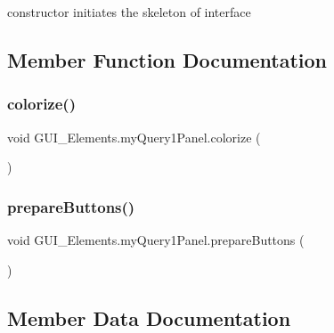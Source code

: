 constructor initiates the skeleton of interface 



\subsection{Member Function Documentation}
\hypertarget{class_g_u_i___elements_1_1my_query1_panel_ae73a3545beb076fc0f7114e6175bd423}{}\label{class_g_u_i___elements_1_1my_query1_panel_ae73a3545beb076fc0f7114e6175bd423} 
\subsubsection{\texorpdfstring{colorize()}{colorize()}}
{\footnotesize\ttfamily void G\+U\+I\+\_\+\+Elements.\+my\+Query1\+Panel.\+colorize (\begin{DoxyParamCaption}{ }\end{DoxyParamCaption})}

\hypertarget{class_g_u_i___elements_1_1my_query1_panel_a0b16368de01ed227e625524541a455ea}{}\label{class_g_u_i___elements_1_1my_query1_panel_a0b16368de01ed227e625524541a455ea} 
\subsubsection{\texorpdfstring{prepare\+Buttons()}{prepareButtons()}}
{\footnotesize\ttfamily void G\+U\+I\+\_\+\+Elements.\+my\+Query1\+Panel.\+prepare\+Buttons (\begin{DoxyParamCaption}{ }\end{DoxyParamCaption})}



\subsection{Member Data Documentation}
\hypertarget{class_g_u_i___elements_1_1my_query1_panel_a021a96e74cad421c5dda3f8b98e3feb6}{}\label{class_g_u_i___elements_1_1my_query1_panel_a021a96e74cad421c5dda3f8b98e3feb6} 
